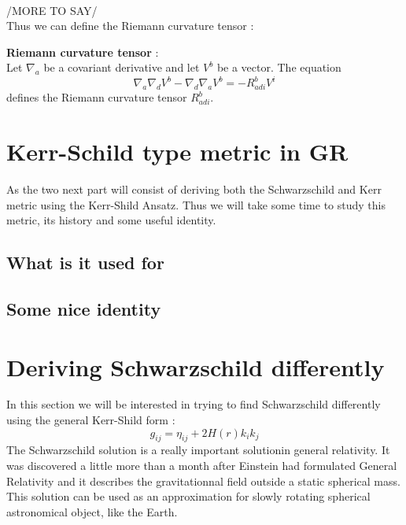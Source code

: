\documentclass[a4paper,12pt]{article}
\theoremstyle{definition}
\begin{document}
\\/MORE TO SAY/\\
Thus we can define the Riemann curvature tensor :
\begin{definition}
	\textbf{Riemann curvature tensor} :\\
	Let $\nabla_a$ be a covariant derivative and let $V^b$ be a vector. The equation
	\begin{equation*}
		\nabla _a \nabla _d V^b - \nabla _d \nabla _aV^b=-R_{adi}^b V^i
	\end{equation*}
	defines the Riemann curvature tensor $R_{adi}^b$.
\end{definition}

\section{Kerr-Schild type metric in GR}
As the two next part will consist of deriving both the Schwarzschild and Kerr metric using the Kerr-Shild Ansatz.
Thus we will take some time to study this metric, its history and some useful identity.
\subsection{What is it used for}
\subsection{Some nice identity}

\section{Deriving Schwarzschild differently}
In this section we will be interested in trying to find Schwarzschild differently using the general Kerr-Shild form :
\begin{equation*}
	g_{ij}=\eta_{ij}+2H(r)k_ik_j
\end{equation*}
The Schwarzschild solution is a really important solutionin general relativity. It was discovered a little more than a month after Einstein had formulated General Relativity and it describes the gravitationnal field outside a static spherical mass.
This solution can be used as an approximation for slowly rotating spherical astronomical object, like the Earth.
\end{document}
